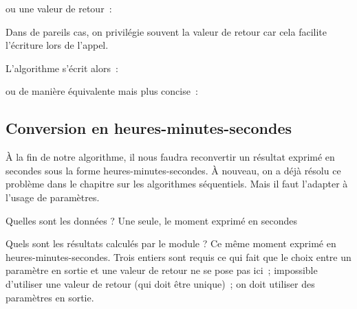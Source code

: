 	ou une valeur de retour~:


	Dans de pareils cas, 
	on privilégie souvent la valeur de retour car cela
	facilite l'écriture lors de l'appel.

	L'algorithme s'écrit alors~:


	ou de manière équivalente mais plus concise~:


\subsection{Conversion en heures-minutes-secondes}

	À la fin de notre algorithme, il nous faudra reconvertir un résultat
	exprimé en secondes sous la forme heures-minutes-secondes. À nouveau,
	on a déjà résolu ce problème dans le chapitre sur les algorithmes
	séquentiels. Mais il faut l'adapter à
	l'usage de paramètres.

	\begin{liste}
	\item {
		Quelles sont les données ? Une seule, le moment exprimé en secondes}
	\item {
		Quels sont les résultats calculés par le module ? Ce même moment exprimé
		en heures-minutes-secondes. Trois entiers sont requis ce qui fait que
		le choix entre un paramètre en sortie et une valeur de retour ne se
		pose pas ici~; impossible d'utiliser une valeur de
		retour (qui doit être unique)~; on doit utiliser des paramètres en
		sortie.}
	\end{liste}

